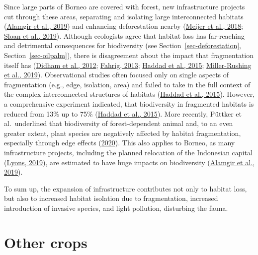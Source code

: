 \documentclass[
  letterpaper,
  DIV=11,
  numbers=noendperiod]{scrreprt}
\begin{document}
Since large parts of Borneo are covered with forest, new infrastructure
projects cut through these areas, separating and isolating large
interconnected habitats
(\protect\hyperlink{ref-alamgirHighriskInfrastructureProjects2019}{Alamgir
et al., 2019}) and enhancing deforestation nearby
(\protect\hyperlink{ref-meijerGlobalPatternsCurrent2018}{Meijer et al.,
2018};
\protect\hyperlink{ref-sloanHiddenChallengesConservation2019}{Sloan et
al., 2019}). Although ecologists agree that habitat loss has
far-reaching and detrimental consequences for biodiversity (see
Section~\ref{sec-deforestation}, Section~\ref{sec-oilpalm}), there is
disagreement about the impact that fragmentation itself has
(\protect\hyperlink{ref-didhamRethinkingConceptualFoundations2012a}{Didham
et al., 2012};
\protect\hyperlink{ref-fahrigRethinkingPatchSize2013}{Fahrig, 2013};
\protect\hyperlink{ref-haddadHabitatFragmentationIts2015a}{Haddad et
al., 2015};
\protect\hyperlink{ref-miller-rushingHowDoesHabitat2019}{Miller-Rushing
et al., 2019}). Observational studies often focused only on single
aspects of fragmentation (e.g., edge, isolation, area) and failed to
take in the full context of the complex interconnected structures of
habitats
(\protect\hyperlink{ref-haddadHabitatFragmentationIts2015a}{Haddad et
al., 2015}). However, a comprehensive experiment indicated, that
biodiversity in fragmented habitats is reduced from 13\% up to 75\%
(\protect\hyperlink{ref-haddadHabitatFragmentationIts2015a}{Haddad et
al., 2015}). More recently, Püttker et al.~underlined that biodiversity
of forest-dependent animal and, to an even greater extent, plant species
are negatively affected by habitat fragmentation, especially through
edge effects
(\protect\hyperlink{ref-puttkerIndirectEffectsHabitat2020}{2020}). This
also applies to Borneo, as many infrastructure projects, including the
planned relocation of the Indonesian capital
(\protect\hyperlink{ref-lyonsWhyIndonesiaMoving2019}{Lyons, 2019}), are
estimated to have huge impacts on biodiversity
(\protect\hyperlink{ref-alamgirHighriskInfrastructureProjects2019}{Alamgir
et al., 2019}).

To sum up, the expansion of infrastructure contributes not only to
habitat loss, but also to increased habitat isolation due to
fragmentation, increased introduction of invasive species, and light
pollution, disturbing the fauna.

\hypertarget{other-crops}{%
\section{Other crops}\label{other-crops}}
\end{document}
